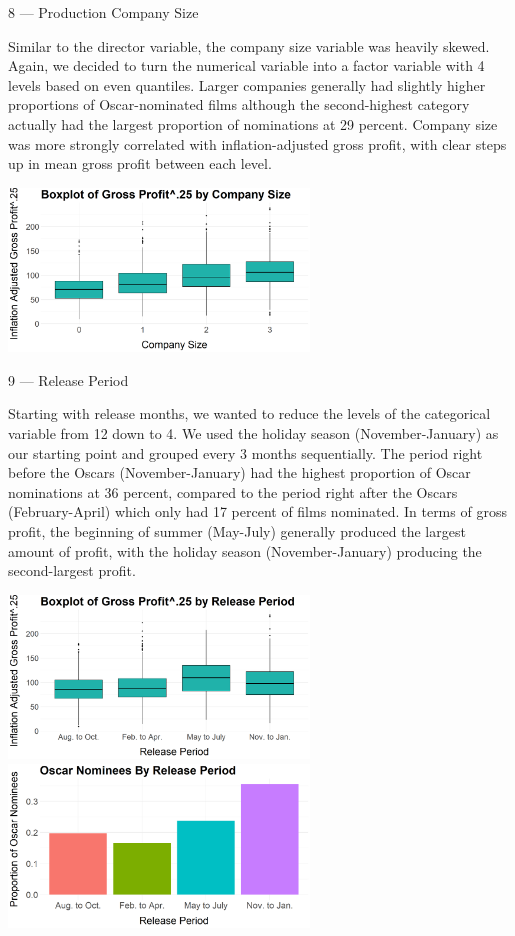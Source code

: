 \documentclass[10pt]{article}
\begin{document}
8 --- Production Company Size

Similar to the director variable, the company size variable was heavily skewed. Again, we decided to turn the numerical variable into a factor variable with 4 levels based on even quantiles. Larger companies generally had slightly higher proportions of Oscar-nominated films although the second-highest category actually had the largest proportion of nominations at 29 percent. Company size was more strongly correlated with inflation-adjusted gross profit, with clear steps up in mean gross profit between each level. 

\begin{center}
\includegraphics[width=8cm]{_assets/_eda/co_size_iagp_bp.png}

\end{center}

9 --- Release Period

Starting with release months, we wanted to reduce the levels of the categorical variable from 12 down to 4. We used the holiday season (November-January) as our starting point and grouped every 3 months sequentially. The period right before the Oscars (November-January) had the highest proportion of Oscar nominations at 36 percent, compared to the period right after the Oscars (February-April) which only had 17 percent of films nominated. In terms of gross profit, the beginning of summer (May-July) generally produced the largest amount of profit, with the holiday season (November-January) producing the second-largest profit. 

\begin{center}
\includegraphics[width=8cm]{_assets/_eda/releaseperiod_iagp_bp.png}
\hspace{1cm}
\includegraphics[width=8cm]{_assets/_eda/on_by_release_period.png}

\end{center}
	
\end{document}
